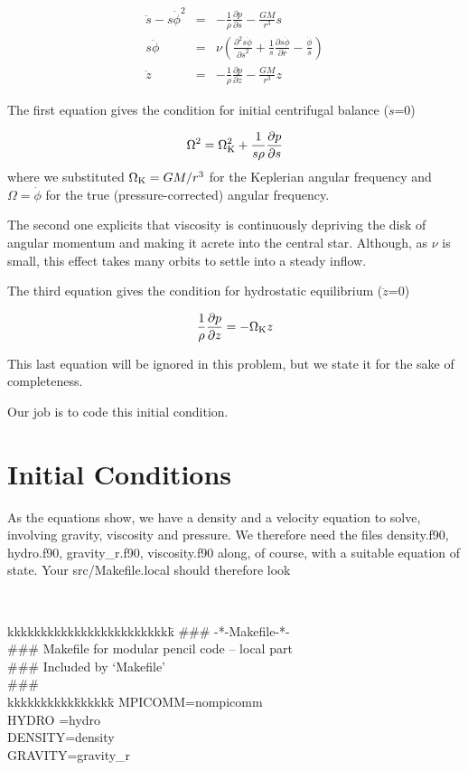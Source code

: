 \documentclass[a4paper,10pt]{article}
\newcommand{\pderiv}[2]{\frac{\partial #1}{\partial #2}}
\newcommand{\pderivn}[3]{\frac{{\partial{}}^{#3} #1}{{\partial #2}^{#3}}}
\begin{document}
\begin{eqnarray}
\ddot{s} - s{\dot{\phi}}^2 &=&  -\frac{1}{\rho}\pderiv{p}{s} - \frac{GM}{r^3}s\\ 
s\ddot{\phi}  &=&  \nu \left(\pderivn{s\dot\phi}{s}{2} + \frac{1}{s}\pderiv{s\dot{\phi}}{r} - \frac{\dot\phi}{s} \right)\\
\ddot{z}  &=& -\frac{1}{\rho}\pderiv{p}{z} - \frac{GM}{r^3}z 
\end{eqnarray}

The first equation gives the condition for initial centrifugal balance ($\ddot{s}$=0)

\begin{equation}
  \label{centrifugal}
  \Omega^2 = \Omega_{\rm K}^2 + \frac{1}{s\rho}\pderiv{p}{s} 
\end{equation}where we substituted $\Omega_{\rm K}=GM/r^3$ for the Keplerian angular frequency and $\Omega=\dot\phi$ for the true (pressure-corrected) angular frequency.

The second one explicits that viscosity is continuously depriving the disk of angular momentum and making it acrete into the central star. Although, as $\nu$ is small, this effect takes many orbits to settle into a steady inflow. 

The third equation gives the condition for hydrostatic equilibrium ($\ddot{z}$=0)

\begin{equation}
  \frac{1}{\rho}\pderiv{p}{z} = -\Omega_{\rm K} z 
\end{equation}

This last equation will be ignored in this problem, but we state it for the sake of completeness. 

Our job is to code this initial condition.

\section{Initial Conditions}

As the equations show, we have a density and a velocity equation to solve, involving gravity, viscosity and pressure. We therefore need the files density.f90, hydro.f90, gravity\_r.f90, viscosity.f90 along, of course, with a suitable equation of state. Your src/Makefile.local should therefore look


{\tt 
\begin{tabbing}
kkkkkkkkkkkkkkkkkkkkkkkkk\=\kill
\#\#\#  \>  -*-Makefile-*-\\
\#\#\# Makefile for modular pencil code -- local part\\
\#\#\# Included by `Makefile'\\
\#\#\#\\

kkkkkkkkkk\=kkkkkk\=\kill
MPICOMM\>=\>nompicomm\\
HYDRO  \>=\>hydro\\
DENSITY\>=\>density\\
GRAVITY\>=\>gravity\_r
\end{tabbing}
}
\end{document}
